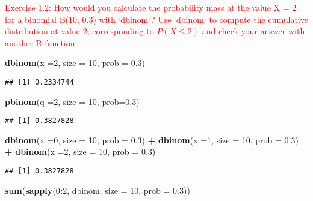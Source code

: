\documentclass[]{article}
\newenvironment{Shaded}{\begin{snugshade}}{\end{snugshade}}
\newcommand{\KeywordTok}[1]{\textcolor[rgb]{0.13,0.29,0.53}{\textbf{#1}}}
\newcommand{\DataTypeTok}[1]{\textcolor[rgb]{0.13,0.29,0.53}{#1}}
\newcommand{\DecValTok}[1]{\textcolor[rgb]{0.00,0.00,0.81}{#1}}
\newcommand{\FloatTok}[1]{\textcolor[rgb]{0.00,0.00,0.81}{#1}}
\newcommand{\StringTok}[1]{\textcolor[rgb]{0.31,0.60,0.02}{#1}}
\newcommand{\OperatorTok}[1]{\textcolor[rgb]{0.81,0.36,0.00}{\textbf{#1}}}
\newcommand{\NormalTok}[1]{#1}
\begin{document}
\textcolor{red}{Exercise 1.2: How would you calculate the probability mass at the value X = 2 for a binomial B(10, 0.3) with `dbinom`? Use `dbinom` to compute the cumulative distribution at value 2, corresponding to $P(X \leq 2)$ and check your answer with another R function}

\begin{Shaded}
\begin{Highlighting}[]
\KeywordTok{dbinom}\NormalTok{(}\DataTypeTok{x =}\DecValTok{2}\NormalTok{, }\DataTypeTok{size =} \DecValTok{10}\NormalTok{, }\DataTypeTok{prob =} \FloatTok{0.3}\NormalTok{)}
\end{Highlighting}
\end{Shaded}

\begin{verbatim}
## [1] 0.2334744
\end{verbatim}

\begin{Shaded}
\begin{Highlighting}[]
\KeywordTok{pbinom}\NormalTok{(}\DataTypeTok{q =}\DecValTok{2}\NormalTok{, }\DataTypeTok{size =} \DecValTok{10}\NormalTok{, }\DataTypeTok{prob=}\FloatTok{0.3}\NormalTok{)}
\end{Highlighting}
\end{Shaded}

\begin{verbatim}
## [1] 0.3827828
\end{verbatim}

\begin{Shaded}
\begin{Highlighting}[]
\KeywordTok{dbinom}\NormalTok{(}\DataTypeTok{x =}\DecValTok{0}\NormalTok{, }\DataTypeTok{size =} \DecValTok{10}\NormalTok{, }\DataTypeTok{prob =} \FloatTok{0.3}\NormalTok{) }\OperatorTok{+}\StringTok{ }\KeywordTok{dbinom}\NormalTok{(}\DataTypeTok{x =}\DecValTok{1}\NormalTok{, }\DataTypeTok{size =} \DecValTok{10}\NormalTok{, }\DataTypeTok{prob =} \FloatTok{0.3}\NormalTok{) }\OperatorTok{+}\StringTok{ }\KeywordTok{dbinom}\NormalTok{(}\DataTypeTok{x =}\DecValTok{2}\NormalTok{, }\DataTypeTok{size =} \DecValTok{10}\NormalTok{, }\DataTypeTok{prob =} \FloatTok{0.3}\NormalTok{)}
\end{Highlighting}
\end{Shaded}

\begin{verbatim}
## [1] 0.3827828
\end{verbatim}

\begin{Shaded}
\begin{Highlighting}[]
\KeywordTok{sum}\NormalTok{(}\KeywordTok{sapply}\NormalTok{(}\DecValTok{0}\OperatorTok{:}\DecValTok{2}\NormalTok{, dbinom, }\DataTypeTok{size =} \DecValTok{10}\NormalTok{, }\DataTypeTok{prob =} \FloatTok{0.3}\NormalTok{))}
\end{Highlighting}
\end{Shaded}
\end{document}
